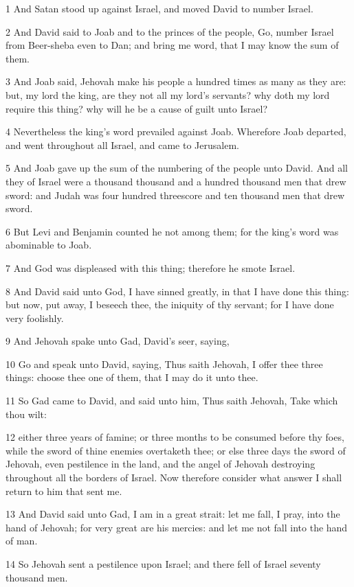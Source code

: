 \par 1 And Satan stood up against Israel, and moved David to number Israel.
\par 2 And David said to Joab and to the princes of the people, Go, number Israel from Beer-sheba even to Dan; and bring me word, that I may know the sum of them.
\par 3 And Joab said, Jehovah make his people a hundred times as many as they are: but, my lord the king, are they not all my lord's servants? why doth my lord require this thing? why will he be a cause of guilt unto Israel?
\par 4 Nevertheless the king's word prevailed against Joab. Wherefore Joab departed, and went throughout all Israel, and came to Jerusalem.
\par 5 And Joab gave up the sum of the numbering of the people unto David. And all they of Israel were a thousand thousand and a hundred thousand men that drew sword: and Judah was four hundred threescore and ten thousand men that drew sword.
\par 6 But Levi and Benjamin counted he not among them; for the king's word was abominable to Joab.
\par 7 And God was displeased with this thing; therefore he smote Israel.
\par 8 And David said unto God, I have sinned greatly, in that I have done this thing: but now, put away, I beseech thee, the iniquity of thy servant; for I have done very foolishly.
\par 9 And Jehovah spake unto Gad, David's seer, saying,
\par 10 Go and speak unto David, saying, Thus saith Jehovah, I offer thee three things: choose thee one of them, that I may do it unto thee.
\par 11 So Gad came to David, and said unto him, Thus saith Jehovah, Take which thou wilt:
\par 12 either three years of famine; or three months to be consumed before thy foes, while the sword of thine enemies overtaketh thee; or else three days the sword of Jehovah, even pestilence in the land, and the angel of Jehovah destroying throughout all the borders of Israel. Now therefore consider what answer I shall return to him that sent me.
\par 13 And David said unto Gad, I am in a great strait: let me fall, I pray, into the hand of Jehovah; for very great are his mercies: and let me not fall into the hand of man.
\par 14 So Jehovah sent a pestilence upon Israel; and there fell of Israel seventy thousand men.
